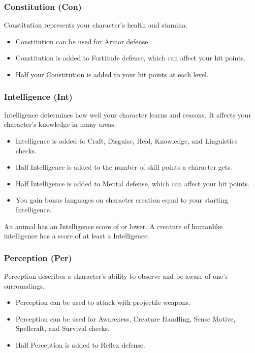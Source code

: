 \subsubsection{Constitution (Con)}
Constitution represents your character's health and stamina.
\begin{itemize}
    \item Constitution can be used for Armor defense.
    \item Constitution is added to Fortitude defense, which can affect your hit points.
    \item Half your Constitution is added to your hit points at each level.
\end{itemize}

\subsubsection{Intelligence (Int)}
Intelligence determines how well your character learns and reasons. It affects your character's knowledge in many areas.

\begin{itemize}
    \item Intelligence is added to Craft, Disguise, Heal, Knowledge, and Linguistics checks.
    \item Half Intelligence is added to the number of skill points a character gets.
    \item Half Intelligence is added to Mental defense, which can affect your hit points.
    \item You gain bonus languages on character creation equal to your starting Intelligence.
\end{itemize}

\par An animal has an Intelligence score of  or lower. A creature of humanlike intelligence has a score of at least a  Intelligence.

\subsubsection{Perception (Per)}
Perception describes a character's ability to observe and be aware of one's surroundings.
\begin{itemize}
    \item Perception can be used to attack with projectile weapons.
    \item Perception can be used for Awareness, Creature Handling, Sense Motive, Spellcraft, and Survival checks.
    \item Half Perception is added to Reflex defense.
\end{itemize}

